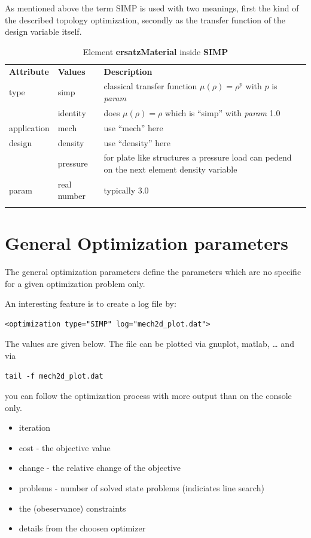 As mentioned above the term SIMP is used with two meanings, first the kind of the described
topology optimization, secondly as the transfer function of the design variable itself.

\begin{center}
\begin{longtable}{llp{}}
\hline\noalign{\smallskip}
\textbf{Attribute} & \textbf{Values} & \textbf{Description} \\
\noalign{\smallskip}\hline\noalign{\smallskip}
type     & simp  & classical transfer function $\mu(\rho) = \rho^p$ with $p$ is \textsl{param} \\
         & identity & does  $\mu(\rho) = \rho$ which is ``simp'' with \textsl{param} 1.0 \\
application & mech & use ``mech'' here \\
design & density & use ``density'' here \\
       & pressure & for plate like structures a pressure load can pedend on the next element density variable \\
param & real number & typically 3.0 \\                   
\noalign{\smallskip}\hline\noalign{\smallskip}
\caption{Element \textbf{ersatzMaterial} inside \textbf{SIMP}}
\end{longtable}
\end{center} 

\section{General Optimization parameters}
The general optimization parameters define the parameters which are no
specific for a given optimization problem only.

An interesting feature is to create a log file by: 
\begin{verbatim}
<optimization type="SIMP" log="mech2d_plot.dat">
\end{verbatim}
The values are given below. The file can be plotted via gnuplot, matlab, \ldots 
and via 
\begin{verbatim}
tail -f mech2d_plot.dat
\end{verbatim}
you can follow the optimization process with more output than on the console only.
\begin{itemize}
  \item iteration
  \item cost - the objective value
  \item change - the relative change of the objective
  \item problems - number of solved state problems (indiciates line search)
  \item the (obeservance) constraints
  \item details from the choosen optimizer
\end{itemize}

